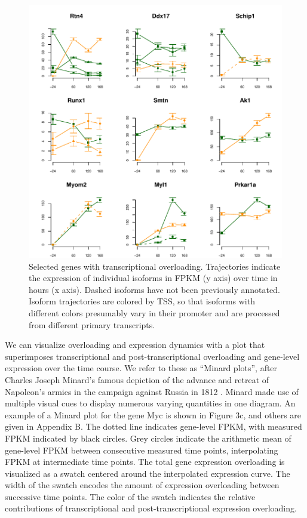 \documentclass[12pt]{amsart}
\theoremstyle{definition}
\begin{document}
\begin{figure}[!ht] 
    \includegraphics{pdfs/promoter_overloaded}
    \caption[Selected genes with transcriptional overloading]{Selected
      genes with transcriptional overloading. Trajectories indicate
      the expression of individual isoforms in FPKM (y axis) over time
      in hours (x axis). Dashed isoforms have not been previously
      annotated. Isoform trajectories are colored by TSS, so that
      isoforms with different colors presumably vary in their promoter
      and are processed from different primary transcripts.  \label{promoter_overloaded}}
\end{figure}

We can visualize overloading and expression dynamics with a plot that
superimposes transcriptional and post-transcriptional overloading and
gene-level expression over the time course. We refer to these as
``Minard plots'', after Charles Joseph Minard's famous depiction
of the advance and retreat of
Napoleon's armies in the campaign against Russia in 1812
\cite{Tufte2001}. Minard made use of multiple visual cues to display
numerous varying quantities in one diagram. An example of a Minard
plot for the gene
Myc is shown in Figure 3c, and others are given in Appendix B. The dotted line indicates gene-level FPKM, with measured
FPKM indicated by black circles. Grey circles indicate the arithmetic mean of
gene-level FPKM between consecutive measured time points, interpolating FPKM
at intermediate time points. The total gene expression overloading is
visualized as a swatch centered around the interpolated expression curve.
The width of the swatch encodes the amount of expression overloading between
successive time points. The color of the swatch indicates the relative
contributions of transcriptional and post-transcriptional expression
overloading.
\end{document}
